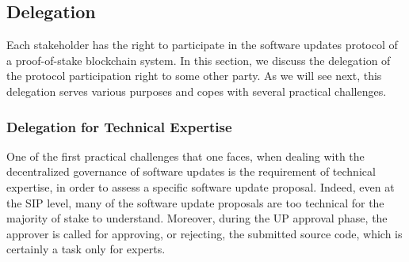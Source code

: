 \subsection{Delegation} \label{appxdelegation}
Each stakeholder has the right to participate in the software updates protocol of a proof-of-stake blockchain system.
In this section, we discuss the delegation of the protocol participation right to some other party. As we will see next, this delegation serves various purposes and copes with several practical challenges.
\subsubsection{Delegation for Technical Expertise}\label{delfortech}
One of the first practical challenges that one faces, when dealing with the decentralized governance of software updates is the requirement of technical expertise, in order to assess a specific software update proposal. Indeed, even at the SIP level, many of the software update proposals are too technical for the majority of stake to understand. Moreover, during the UP approval phase, the approver is called for approving, or rejecting, the submitted source code, which is certainly a task only for experts.

